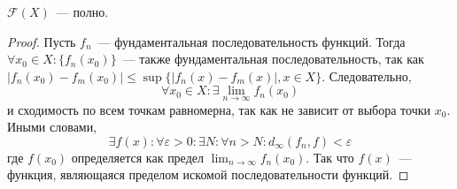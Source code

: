 \documentclass[11pt]{article}
\begin{document}
    \begin{lemma}
    $\mathcal{F}(X)$~--- полно.
    \begin{proof}
    Пусть $f_{n}$~--- фундаментальная последовательность функций. Тогда $\forall x_0 \in X: \{f_{n}(x_0)\}$~--- также фундаментальная последовательность, так как $|f_{n}(x_0) - f_{m}(x_0)| \leq \sup\{|f_{n}(x) - f_{m}(x)|, x \in X\}$. Следовательно,
    \begin{equation*}
        \forall x_0 \in X: \exists \lim_{n \to \infty} f_{n}(x_0)
    \end{equation*}
    и сходимость по всем точкам равномерна, так как не зависит от выбора точки $x_0$. Иными словами,
    \begin{equation*}
        \exists f(x): \forall \varepsilon > 0: \exists N: \forall n > N: d_{\infty}(f_n, f) < \varepsilon
    \end{equation*}
    где $f(x_0)$ определяется как предел $ \lim_{n \to \infty} f_{n}(x_0)$. Так что $f(x)$~--- функция, являющаяся пределом искомой последовательности функций.
    \end{proof}
    \end{lemma}
\end{document}

